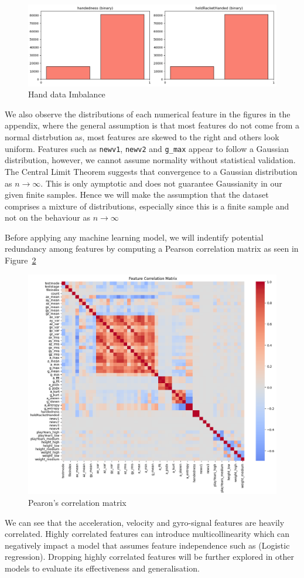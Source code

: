 \documentclass[10pt,twocolumn]{article}
\begin{document}
\begin{figure}[H]
    \centering
    \includegraphics[width=0.85\linewidth]{hand_data.png}
    \caption{Hand data Imbalance}
    \label{fig:stacked-hand-results}
\end{figure}

We also observe the distributions of each numerical feature in the figures in the appendix, where the general assumption is that most features do not come from a normal distrbution as, most features are skewed to the right and others look uniform. Features such as \texttt{newv1}, \texttt{newv2} and \texttt{g\_max} appear to follow a Gaussian distribution, however, we cannot assume normality without statistical validation. The Central Limit Theorem suggests that convergence to a Gaussian distribution as $n \rightarrow \infty $. This is only aymptotic and does not guarantee Gaussianity in our given finite samples. Hence we will make the assumption that the dataset comprises a mixture of distributions, especially since this is a finite sample and not on the behaviour as $n \rightarrow \infty$

Before applying any machine learning model, we will indentify potential redundancy among features by computing a Pearson correlation matrix as seen in Figure~\ref{fig:correlation-matrix}
\begin{figure}[H]
    \centering
    \includegraphics[width=0.85\linewidth]{correlation_matrix.png}
    \caption{Pearon's correlation matrix}
    \label{fig:correlation-matrix}
\end{figure}
We can see that the acceleration, velocity and gyro-signal features are heavily correlated. Highly correlated features can introduce multicollinearity which can negatively impact a model that assumes feature independence such as (Logistic regression). Dropping highly correlated features will be further explored in other models to evaluate its effectiveness and generalisation.
\end{document}
